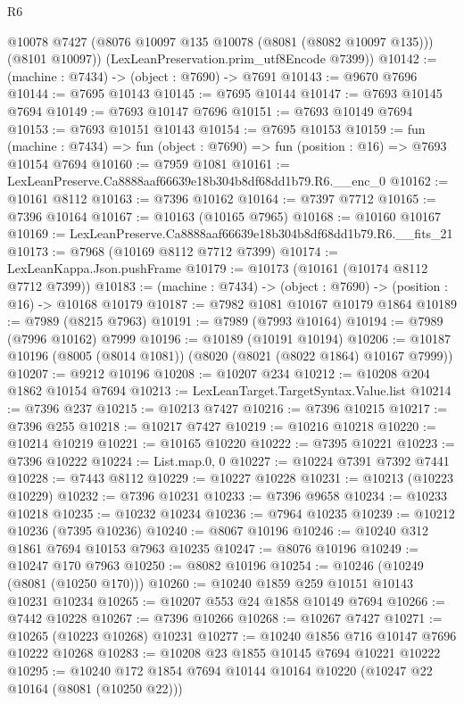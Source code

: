 \begin{lexlean}{R6}
\begin{coremodule}
        @10078
        @7427
        (@8076 @10097 @135 @10078 (@8081 (@8082 @10097 @135)))
        (@8101 @10097))
      (LexLeanPreservation.prim_utf8Encode @7399))
@10142 := (machine : @7434) -> (object : @7690) -> @7691
@10143 := @9670 @7696
@10144 := @7695 @10143
@10145 := @7695 @10144
@10147 := @7693 @10145 @7694
@10149 := @7693 @10147 @7696
@10151 := @7693 @10149 @7694
@10153 := @7693 @10151 @10143
@10154 := @7695 @10153
@10159 := fun (machine : @7434) =>
  fun (object : @7690) => fun (position : @16) => @7693 @10154 @7694
@10160 := @7959 @1081
@10161 := LexLeanPreserve.Ca8888aaf66639e18b304b8df68dd1b79.R6.__enc_0
@10162 := @10161 @8112
@10163 := @7396 @10162
@10164 := @7397 @7712
@10165 := @7396 @10164
@10167 := @10163 (@10165 @7965)
@10168 := @10160 @10167
@10169 := LexLeanPreserve.Ca8888aaf66639e18b304b8df68dd1b79.R6.__fits_21
@10173 := @7968 (@10169 @8112 @7712 @7399)
@10174 := LexLeanKappa.Json.pushFrame
@10179 := @10173 (@10161 (@10174 @8112 @7712 @7399))
@10183 := (machine : @7434) -> (object : @7690) -> (position : @16) -> @10168 @10179
@10187 := @7982 @1081 @10167 @10179 @1864
@10189 := @7989 (@8215 @7963)
@10191 := @7989 (@7993 @10164)
@10194 := @7989 (@7996 @10162) @7999
@10196 := @10189 (@10191 @10194)
@10206 := @10187 @10196 (@8005 (@8014 @1081)) (@8020 (@8021 (@8022 @1864) @10167 @7999))
@10207 := @9212 @10196
@10208 := @10207 @234
@10212 := @10208 @204 @1862 @10154 @7694
@10213 := LexLeanTarget.TargetSyntax.Value.list
@10214 := @7396 @237
@10215 := @10213 @7427
@10216 := @7396 @10215
@10217 := @7396 @255
@10218 := @10217 @7427
@10219 := @10216 @10218
@10220 := @10214 @10219
@10221 := @10165 @10220
@10222 := @7395 @10221
@10223 := @7396 @10222
@10224 := List.map.{0, 0}
@10227 := @10224 @7391 @7392 @7441
@10228 := @7443 @8112
@10229 := @10227 @10228
@10231 := @10213 (@10223 @10229)
@10232 := @7396 @10231
@10233 := @7396 @9658
@10234 := @10233 @10218
@10235 := @10232 @10234
@10236 := @7964 @10235
@10239 := @10212 @10236 (@7395 @10236)
@10240 := @8067 @10196
@10246 := @10240 @312 @1861 @7694 @10153 @7963 @10235
@10247 := @8076 @10196
@10249 := @10247 @170 @7963
@10250 := @8082 @10196
@10254 := @10246 (@10249 (@8081 (@10250 @170)))
@10260 := @10240 @1859 @259 @10151 @10143 @10231 @10234
@10265 := @10207 @553 @24 @1858 @10149 @7694
@10266 := @7442 @10228
@10267 := @7396 @10266
@10268 := @10267 @7427
@10271 := @10265 (@10223 @10268) @10231
@10277 := @10240 @1856 @716 @10147 @7696 @10222 @10268
@10283 := @10208 @23 @1855 @10145 @7694 @10221 @10222
@10295 := @10240 @172 @1854 @7694 @10144 @10164 @10220 (@10247 @22 @10164 (@8081 (@10250 @22)))

\end{coremodule}
\end{lexlean}
